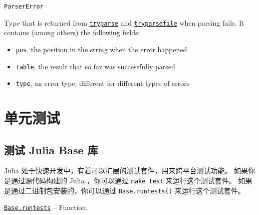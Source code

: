 \begin{adjustwidth}{2em}{0pt}


\begin{verbatim}
ParserError
\end{verbatim}

Type that is returned from \hyperlink{16126470487745448226}{\texttt{tryparse}} and \hyperlink{1998506580442532282}{\texttt{tryparsefile}} when parsing fails. It contains (among others) the following fields:

\begin{itemize}
\item \texttt{pos}, the position in the string when the error happened


\item \texttt{table}, the result that so far was successfully parsed


\item \texttt{type}, an error type, different for different types of errors

\end{itemize}


\end{adjustwidth}

\hypertarget{17778253023886211260}{}


\chapter{单元测试}





\hypertarget{10440826130497106701}{}


\section{测试 Julia Base 库}



Julia 处于快速开发中，有着可以扩展的测试套件，用来跨平台测试功能。 如果你是通过源代码构建的 Julia ，你可以通过 \texttt{make test} 来运行这个测试套件。 如果是通过二进制包安装的，你可以通过 \texttt{Base.runtests()} 来运行这个测试套件。


\hypertarget{2272377293323848310}{}
\hyperlink{2272377293323848310}{\texttt{Base.runtests}}  -- {Function.}

